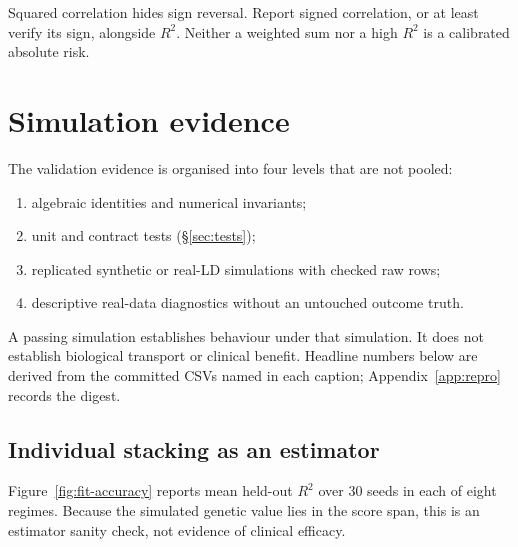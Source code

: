 \documentclass[11pt,a4paper]{article}
\newcommand{\Rtwo}{\(R^2\)}
\begin{document}
Squared correlation hides sign reversal. Report signed
correlation, or at least verify its sign, alongside \Rtwo{}.
Neither a weighted sum nor a high \Rtwo{} is a calibrated
absolute risk.

\section{Simulation evidence}
\label{sec:evidence}

The validation evidence is organised into four levels that are
not pooled:
\begin{enumerate}
  \item algebraic identities and numerical invariants;
  \item unit and contract tests (\S\ref{sec:tests});
  \item replicated synthetic or real-LD simulations with checked
    raw rows;
  \item descriptive real-data diagnostics without an untouched
    outcome truth.
\end{enumerate}
A passing simulation establishes behaviour under that
simulation. It does not establish biological transport or
clinical benefit. Headline numbers below are derived from the
committed CSVs named in each caption; Appendix~\ref{app:repro}
records the digest.

\subsection{Individual stacking as an estimator}
\label{sec:fit}

Figure~\ref{fig:fit-accuracy} reports mean held-out \Rtwo{} over
30 seeds in each of eight regimes. Because the simulated genetic
value lies in the score span, this is an estimator sanity check,
not evidence of clinical efficacy.
\end{document}
